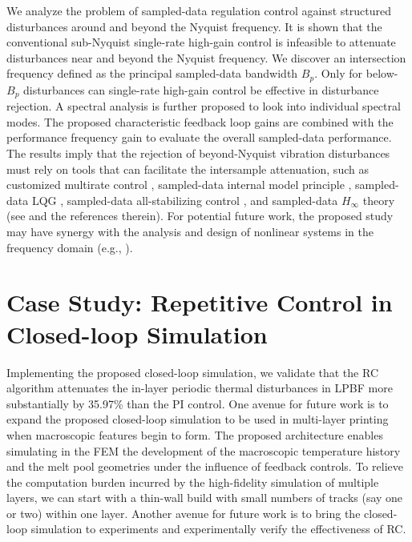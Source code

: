 \documentclass [11pt, proquest] {uwthesis}[2020/02/24]
\begin{document}
We analyze the problem of sampled-data regulation control against
structured disturbances around and beyond the Nyquist frequency. It is shown that the conventional sub-Nyquist single-rate
high-gain control is infeasible to attenuate disturbances near and
beyond the Nyquist frequency. We discover an intersection frequency
defined as the principal sampled-data bandwidth $B_{p}$. Only for
below-$B_{p}$ disturbances can single-rate high-gain control be effective
in disturbance rejection. A spectral analysis is further proposed
to look into individual spectral modes. The proposed characteristic
feedback loop gains are combined with the performance frequency gain
to evaluate the overall sampled-data performance. The results imply
that the rejection of beyond-Nyquist vibration disturbances must rely
on tools that can facilitate the intersample attenuation, such as
customized multirate control \cite{XuChen_beyondNyquist15}, sampled-data
internal model principle \cite{Fujioka:2011dy}, sampled-data LQG
\cite{Chen:1991cp}, sampled-data all-stabilizing control \cite{Ravi:1990eo},
and sampled-data $H_{\infty}$ theory (see \cite{Lall:2001cm} and
the references therein). For potential future work, the proposed study
may have synergy with the analysis and design of nonlinear systems
in the frequency domain (e.g., \cite{jing2015frequency,lang2007output,xiao2016frequency}).

\section*{Case Study: Repetitive Control in Closed-loop Simulation}

Implementing the proposed closed-loop simulation, we validate
that the RC algorithm attenuates the in-layer periodic thermal disturbances in LPBF
more substantially by 35.97\% than the PI control. One avenue for future work is to expand the proposed closed-loop simulation
to be used in multi-layer printing when macroscopic features begin
to form. The proposed architecture enables simulating in the FEM the
development of the macroscopic temperature history and the melt pool
geometries under the influence of feedback controls. To relieve the
computation burden incurred by the high-fidelity simulation of multiple
layers, we can start with a thin-wall build with small numbers of
tracks (say one or two) within one layer. Another avenue for future work is to bring the closed-loop simulation to experiments and experimentally verify the effectiveness of RC.

%
%


%
%
\appendix
\raggedbottom\sloppy
 
\end{document}
